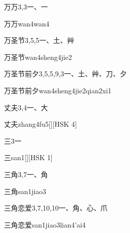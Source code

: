 \begin{entry}{万万}{3,3}{⼀、⼀}
  \begin{phonetics}{万万}{wan4wan4}
  \end{phonetics}
\end{entry}

\begin{entry}{万圣节}{3,5,5}{⼀、⼟、⾋}
  \begin{phonetics}{万圣节}{wan4sheng4jie2}
  \end{phonetics}
\end{entry}

\begin{entry}{万圣节前夕}{3,5,5,9,3}{⼀、⼟、⾋、⼑、⼣}
  \begin{phonetics}{万圣节前夕}{wan4sheng4jie2qian2xi1}
  \end{phonetics}
\end{entry}

\begin{entry}{丈夫}{3,4}{⼀、⼤}
  \begin{phonetics}{丈夫}{zhang4fu5}[][HSK 4]
  \end{phonetics}
\end{entry}

\begin{entry}{三}{3}{⼀}
  \begin{phonetics}{三}{san1}[][HSK 1]
  \end{phonetics}
\end{entry}

\begin{entry}{三角}{3,7}{⼀、⾓}
  \begin{phonetics}{三角}{san1jiao3}
  \end{phonetics}
\end{entry}

\begin{entry}{三角恋爱}{3,7,10,10}{⼀、⾓、⼼、⽖}
  \begin{phonetics}{三角恋爱}{san1jiao3lian4'ai4}
  \end{phonetics}
\end{entry}

